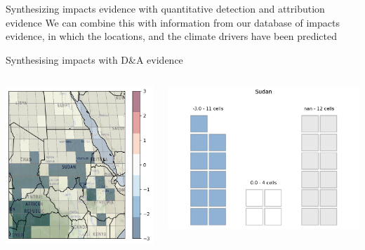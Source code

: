 \documentclass[9pt]{beamer}
\begin{document}
\begin{frame}{Synthesizing impacts evidence with quantitative detection and attribution evidence}
We can combine this with information from our database of impacts evidence, in which the locations, and the climate drivers have been predicted

\end{frame}

\begin{frame}{Synthesising impacts with D\&A evidence}
\begin{columns}
	\begin{column}{0.4\linewidth}
		\includegraphics[width=\linewidth]{../plots/maps/sudan_precipitation.png}
	\end{column}

	\begin{column}{0.4\linewidth}
		\includegraphics[width=\linewidth]{../plots/maps/sudan_gridcell_count.png}
	\end{column}
\end{columns}


\end{frame}
\end{document}
